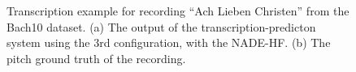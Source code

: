\begin{figure}
 \caption{Transcription example for recording  ``Ach Lieben Christen'' from the Bach10 dataset. (a) The output of the transcription-predicton system using the 3rd configuration, with the NADE-HF. (b) The pitch ground truth of the recording.}
 \label{fig:Transcription}
\end{figure}

